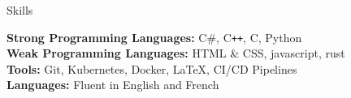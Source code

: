 \documentclass{resume} %
\begin{document}

\begin{rSection}{Skills}

{\bf Strong Programming Languages:} C\#, C\texttt{++}, C, Python\\
{\bf Weak Programming Languages:} HTML \& CSS, javascript, rust \\
{\bf Tools:} Git, Kubernetes, Docker, LaTeX, CI/CD Pipelines \\
{\bf Languages:} Fluent in English and French

\end{rSection}

\end{document}
